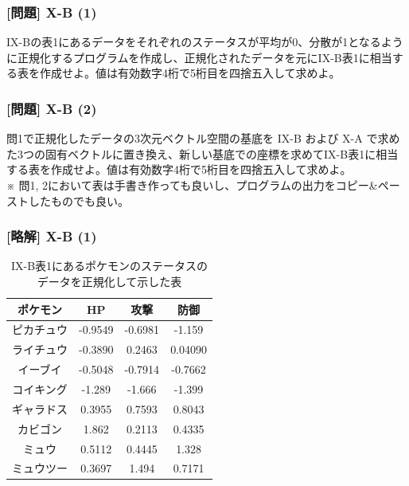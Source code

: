 \documentclass[dvipdfmx,aspectratio=169,20pt]{beamer}
\newcommand{\myfontsetting}[3]{{\fontsize{#1}{#2}\selectfont #3}}
\begin{document}
\graphicspath{{figs/}}

\begin{frame}
\frametitle{[問題] X-B (1)}

\myfontsetting{18pt}{20pt}{
I\hspace{-.1em}X-Bの表1にあるデータをそれぞれのステータスが平均が0、分散が1となるように正規化するプログラムを作成し、正規化されたデータを元にI\hspace{-.1em}X-B表1に相当する表を作成せよ。値は有効数字4桁で5桁目を四捨五入して求めよ。%
}
\end{frame}
\begin{frame}
\frametitle{[問題] X-B (2)}

\myfontsetting{18pt}{20pt}{
問1で正規化したデータの3次元ベクトル空間の基底を I\hspace{-.1em}X-B および X-A で求めた3つの固有ベクトルに置き換え、新しい基底での座標を求めてI\hspace{-.1em}X-B表1に相当する表を作成せよ。値は有効数字4桁で5桁目を四捨五入して求めよ。%
}\\
\myfontsetting{12pt}{12pt}{
※ 問1, 2において表は手書き作っても良いし、プログラムの出力をコピー\&ペーストしたものでも良い。
}
\end{frame}
\begin{frame}
\frametitle{[略解] X-B (1)}

\myfontsetting{12pt}{12pt}{
\begin{table}[htbp]
    \centering
\begin{tabular}{|c||c|c|c|}
\hline
ポケモン & HP & 攻撃 & 防御\\
\hline
ピカチュウ	& -0.9549	& -0.6981	& -1.159\\
ライチュウ	& -0.3890	& 0.2463	& 0.04090\\
イーブイ	& -0.5048	& -0.7914	& -0.7662\\
コイキング	& -1.289	& -1.666	& -1.399\\
ギャラドス	&  0.3955	& 0.7593	& 0.8043\\
カビゴン	&  1.862	& 0.2113	& 0.4335\\
ミュウ		&  0.5112	& 0.4445	& 1.328\\
ミュウツー	&  0.3697	& 1.494		& 0.7171\\
\hline
\end{tabular}
\caption{\myfontsetting{10pt}{10pt}{
I\hspace{-.1em}X-B表1にあるポケモンのステータスのデータを正規化して示した表
}}
\end{table}
}

\end{frame}
\end{document}
